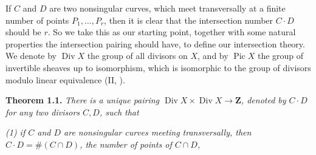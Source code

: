 {If $C$ and $D$ are two nonsingular curves, which meet transversally at a finite number of points $P_1,\ldots,P_r$, then it is clear that the intersection number $C\cdot D$ should be $r$. So we take this as our starting point, together with some natural properties the intersection pairing should have, to define our intersection theory. We denote by $\operatorname{Div}X$ the group of all divisors on $X$, and by $\operatorname{Pic}X$ the group of invertible sheaves up to isomorphism, which is isomorphic to the group of divisors modulo linear equivalence (II, ).

\medskip
\noindent\hypertarget{result-V-1.1}{}\textbf{Theorem 1.1.} \emph{There is a unique pairing $\operatorname{Div}X\times\operatorname{Div}X\to\mathbf Z$, denoted by $C\cdot D$ for any two divisors $C,D$, such that}
\par{\itshape\leftskip=13pt
\noindent\hypertarget{result-V-1.1-1}{}(1) if $C$ and $D$ are nonsingular curves meeting transversally, then $C\cdot D=\#(C\cap D)$, the number of points of $C\cap D$,\par}
}
